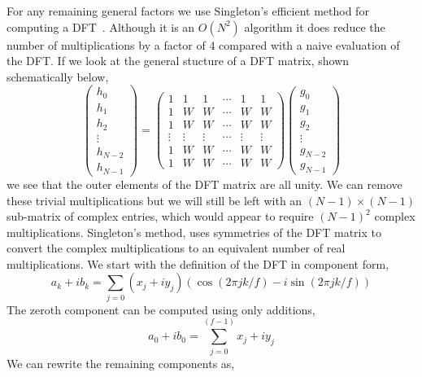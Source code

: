 \documentclass[fleqn,12pt]{article}
\begin{document}
For any remaining general factors we use Singleton's efficient method
for computing a DFT~\cite{singleton}. Although it is an $O(N^2)$
algorithm it does reduce the number of multiplications by a factor of
4 compared with a naive evaluation of the DFT. If we look at the
general stucture of a DFT matrix, shown schematically below,
%
\begin{equation}
\left(
\begin{array}{c}
h_0 \\
h_1 \\
h_2 \\
\vdots \\
h_{N-2} \\
h_{N-1}
\end{array}
\right)
=
\left(
\begin{array}{cccccc}
1 & 1 & 1 & \cdots & 1 & 1 \\
1 & W & W & \cdots & W & W \\
1 & W & W & \cdots & W & W \\
\vdots & \vdots & \vdots & \cdots & \vdots & \vdots \\
1 & W & W & \cdots & W & W \\
1 & W & W & \cdots & W & W 
\end{array}
\right)
\left(
\begin{array}{c}
g_0 \\
g_1 \\
g_2 \\
\vdots \\
g_{N-2} \\
g_{N-1}
\end{array}
\right)
\end{equation}
%
we see that the outer elements of the DFT matrix are all unity. We can
remove these trivial multiplications but we will still be left with an
$(N-1) \times (N-1)$ sub-matrix of complex entries, which would appear
to require $(N-1)^2$ complex multiplications.  Singleton's method,
uses symmetries of the DFT matrix to convert the complex
multiplications to an equivalent number of real multiplications. We
start with the definition of the DFT in component form,
%
\begin{equation}
a_k + i b_k = \sum_{j=0} (x_j+iy_j)(\cos(2\pi jk/f) - i\sin(2\pi jk/f))
\end{equation}
%
The zeroth component can be computed using only additions,
%
\begin{equation}
a_0 + i b_0 = \sum_{j=0}^{(f-1)} x_j + i y_j
\end{equation}
%
We can rewrite the remaining components as,
\end{document}
